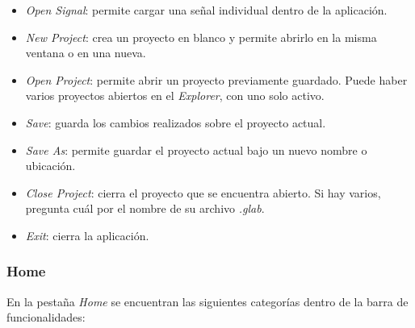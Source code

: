 \documentclass[12pt, letterpaper]{article}
\begin{document}
\begin{itemize}

    \item \textit{Open Signal}: permite cargar una señal individual dentro
    de la aplicación.

    \item \textit{New Project}: crea un proyecto en blanco y permite abrirlo
    en la misma ventana o en una nueva.

    \item \textit{Open Project}: permite abrir un proyecto previamente
    guardado. Puede haber varios proyectos abiertos en el \textit{Explorer},
    con uno solo activo.

    \item \textit{Save}: guarda los cambios realizados sobre el proyecto
    actual.

    \item \textit{Save As}: permite guardar el proyecto actual bajo un nuevo
    nombre o ubicación.

    \item \textit{Close Project}: cierra el proyecto que se encuentra abierto.
    Si hay varios, pregunta cuál por el nombre de su archivo \textit{.glab}.

    \item \textit{Exit}: cierra la aplicación.

\end{itemize}

\subsubsection{Home}

En la pestaña \textit{Home} se encuentran las siguientes categorías dentro
de la barra de funcionalidades:
\end{document}
